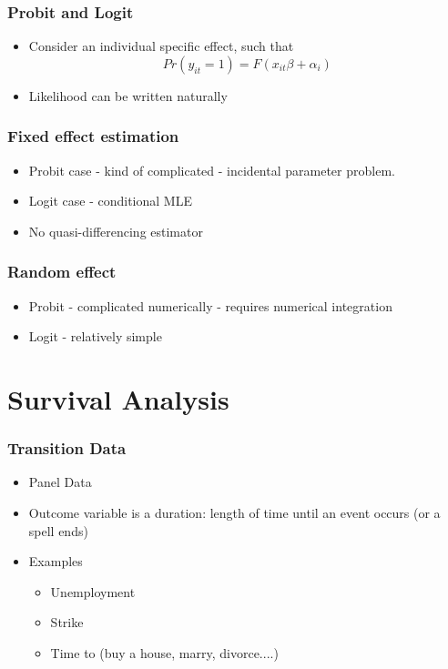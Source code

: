 \documentclass{beamer}
\newcommand{\1}{\mathbb{1}}
\begin{document}
\begin{frame}\frametitle{Probit and Logit}
\begin{itemize}
\item Consider an individual specific effect, such that 
\begin{equation}
Pr(y_{it}=1) = F(x_{it} \beta + \alpha_i)
\end{equation}
\item Likelihood can be written naturally
\end{itemize}
\end{frame}

\begin{frame}\frametitle{Fixed effect estimation}
\begin{itemize}
\item Probit case - kind of complicated - incidental parameter problem. 
\item Logit case - conditional MLE
\item No quasi-differencing estimator
\end{itemize}
\end{frame}

\begin{frame}\frametitle{Random effect }
\begin{itemize}
\item Probit - complicated numerically - requires numerical integration
\item Logit - relatively simple
\end{itemize}
\end{frame}

\section{Survival Analysis}

\begin{frame}
\tableofcontents[currentsection] 
\end{frame}

\begin{frame}\frametitle{Transition Data}
\begin{itemize}
 \item Panel Data
 \item Outcome variable is a duration: length of time until an event occurs (or a spell ends)
 \item Examples
 \begin{itemize}
  \item Unemployment
  \item Strike 
  \item Time to (buy a house, marry, divorce....)
 \end{itemize}
\end{itemize}
\end{frame}
\end{document}
